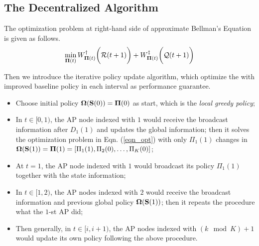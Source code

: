 \subsection{The Decentralized Algorithm}

The optimization problem at right-hand side of approximate Bellman's Equation is given as follows.
\begin{align}
    \min_{\boldsymbol{\Pi}(t)} W^{\dagger}_{\boldsymbol{\Pi}(t)}\bigg(\mathcal{R}(t+1)\bigg) + W^{\ddagger}_{\boldsymbol{\Pi}(t)}\bigg(\mathcal{Q}(t+1)\bigg)
    \label{eqn_opt}
\end{align}

Then we introduce the iterative policy update algorithm, which optimize the 
with improved baseline policy in each interval as performance guarantee.
\begin{itemize}
    \item Choose initial policy $\boldsymbol{\Omega}(\mathbf{S}(0)) = \boldsymbol{\Pi}(0)$ as start, which is the \emph{local greedy policy};
    \item In $t\in[0, 1)$, the AP node indexed with $1$ would receive the broadcast information after $D_1(1)$ and updates the global information; then it solves the optimization problem in Eqn. (\ref{eqn_opt}) with only $\Pi_{1}(1)$ changes in $\boldsymbol{\Omega}(\mathbf{S}(1)) = \boldsymbol{\Pi}(1) = [\Pi_{1}(1), \Pi_{2}(0), \dots, \Pi_{K}(0)]$;
    \item At $t=1$, the AP node indexed with $1$ would broadcast its policy $\Pi_{1}(1)$ together with the state information;
    \item In $t\in[1, 2)$, the AP nodes indexed with $2$ would receive the broadcast information and previous global policy $\boldsymbol{\Omega}(\mathbf{S}(1))$; then it repeats the procedure what the $1$-st AP did;
    \item Then generally, in $t\in[{i}, {i+1})$, the AP nodes indexed with $(k \mod K)+1$ would update its own policy following the above procedure.
\end{itemize}

